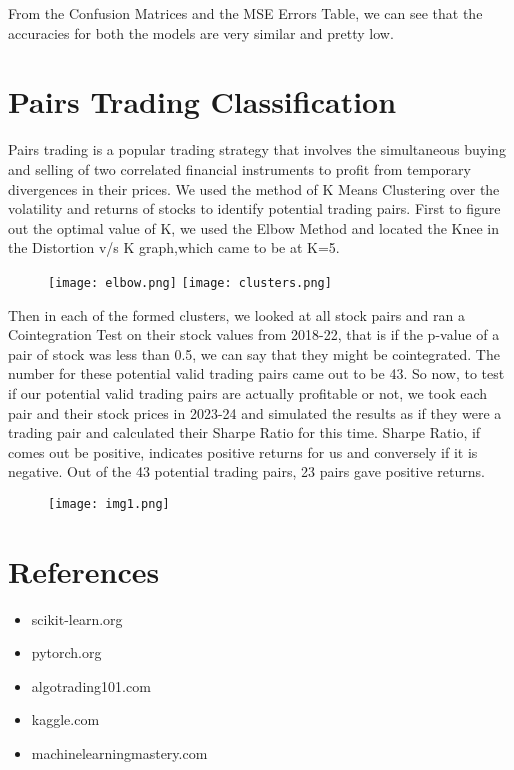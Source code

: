 \documentclass{article}
\begin{document}
From the Confusion Matrices and the MSE Errors Table, we can see that the accuracies for both the models are very similar and pretty low.

\section{Pairs Trading Classification}
Pairs trading is a popular trading strategy that involves the simultaneous buying and selling of two correlated financial instruments to profit from temporary divergences in their prices. We used the method of K Means Clustering over the volatility and returns of stocks to identify potential trading pairs. First to figure out the optimal value of K, we used the Elbow Method and located the Knee in the Distortion v/s K graph,which came to be at K=5.  

\begin{figure}[H]
    \centering
    \texttt{[image: elbow.png]}
    \texttt{[image: clusters.png]}
    \label{fig:enter-label}
\end{figure}

Then in each of the formed clusters, we looked at all stock pairs and ran a Cointegration Test on their stock values from 2018-22, that is if the p-value of a pair of stock was less than 0.5, we can say that they might be cointegrated. The number for these potential valid trading pairs came out to be 43. So now, to test if our potential valid trading pairs are actually profitable or not, we took each pair and their stock prices in 2023-24 and simulated the results as if they were a trading pair and calculated their Sharpe Ratio for this time. Sharpe Ratio, if comes out be positive, indicates positive returns for us and conversely if it is negative. Out of the 43 potential trading pairs, 23 pairs gave positive returns.

\begin{figure}[H]
    \centering
    \texttt{[image: img1.png]}
    \label{fig:enter-label}
\end{figure}

\section{References}
\begin{itemize}
    \item scikit-learn.org
    \item pytorch.org
    \item algotrading101.com
    \item kaggle.com
    \item machinelearningmastery.com
\end{itemize}
\end{document}
